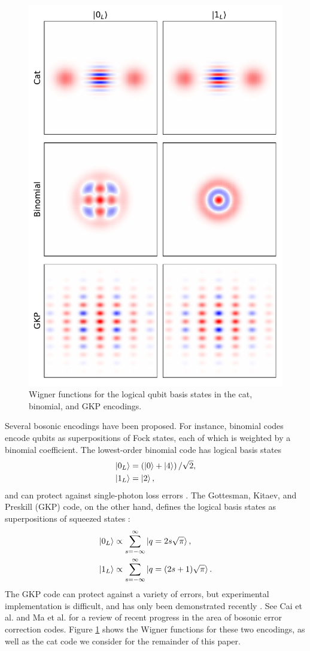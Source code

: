 \begin{figure}[t]
    \centering
    \includegraphics[width=0.8\columnwidth]{figures/cat_binom_gkp.pdf}
    \caption{Wigner functions for the logical qubit basis states in the cat, binomial, and GKP encodings.}
    \label{fig:cat_binom_gkp}
\end{figure}

Several bosonic encodings have been proposed.
For instance, binomial codes encode qubits as superpositions of Fock states, each of which is weighted by a binomial coefficient.
The lowest-order binomial code has logical basis states
\begin{align*}
    \ket{0_L} &= \left ( \ket{0} + \ket{4} \right ) / \sqrt{2}, \\
    \ket{1_L} &= \ket{2},
\end{align*}
and can protect against single-photon loss errors \cite{cai_2021,michael_2016}.
The Gottesman, Kitaev, and Preskill (GKP) code, on the other hand, defines the logical basis states as superpositions of squeezed states \cite{gottesman_2001}:
\begin{align*}
    \ket{0_L} &\propto \sum_{s=-\infty}^{\infty} \ket{q = 2 s \sqrt{\pi}}, \\
    \ket{1_L} &\propto \sum_{s=-\infty}^{\infty} \ket{q = (2 s + 1) \sqrt{\pi}}.
\end{align*}
The GKP code can protect against a variety of errors, but experimental implementation is difficult, and has only been demonstrated recently \cite{campagne_ibarcq_2020}.
See Cai et al. and Ma et al. \cite{cai_2021, ma_2021} for a review of recent progress in the area of bosonic error correction codes.
Figure \ref{fig:cat_binom_gkp} shows the Wigner functions for these two encodings, as well as the cat code we consider for the remainder of this paper.

